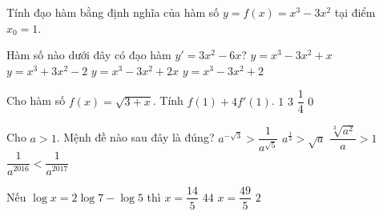 \begin{ex}%
	Tính đạo hàm bằng định  nghĩa của hàm số $y=f(x)=x^3-3x^2$ tại điểm $x_0=1$.
\end{ex}

\begin{ex}%
	Hàm số nào  dưới đây có đạo hàm $y'=3x^2-6x$?
	 \choice
		{$y=x^3-3x^2+x$} 
		 {$y=x^3+3x^2-2$}
		 {$y=x^3-3x^2+2x$}
		 {\True $y=x^3-3x^2+2$}
\end{ex}

\begin{ex}%
	Cho  hàm số $f(x)=\sqrt{3+x}$. Tính $f(1)+4f'(1)$.
	\choice 
		{$1$} 
		{\True $3$} 
		 {$\dfrac{1}{4}$}
		 {$0$}
\end{ex}

\begin{ex}%
	Cho  $a>1$. Mệnh đề nào sau đây là đúng?
	 \choice
		{\True $a^{-\sqrt{3}} >  \dfrac{1}{a^{\sqrt{5}}}$}
		{$a^{\tfrac{1}{3}}  > \sqrt{a}$}
		{$\dfrac{\sqrt[3]{a^2}}{a} >  1$}
		{$\dfrac{1}{a^{2016}} <  \dfrac{1}{a^{2017}}$}
\end{ex}

\begin{ex}%
	Nếu $\log  x=2\log7-\log5$ thì
	\choice 
		{$x=\dfrac{14}{5}$} 
		 {$44$}
		{\True $x=\dfrac{49}{5}$} 
		{$2$} 
\end{ex}

